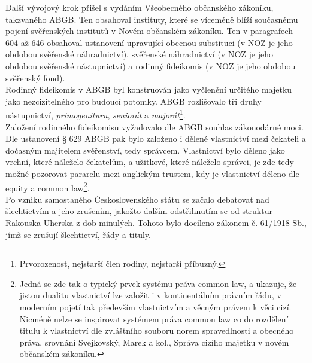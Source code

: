 \documentclass{article}
\begin{document}

Další vývojový krok přišel s vydáním Všeobecného občanského zákoníku, takzvaného ABGB. Ten obsahoval instituty, které se víceméně blíží současnému pojení svěřenských institutů v Novém občanském zákoníku. Ten v paragrafech 604 až 646 obsahoval ustanovení upravující obecnou substituci (v NOZ je jeho obdobou svěřenské náhradnictví), svěřenské náhradnictví (v NOZ je jeho obdobou svěřenské nástupnictví) a rodinný fideikomis (v NOZ je jeho obdobou svěřenský fond).\\

Rodinný fideikomis v ABGB byl konstruován jako vyčlenění určitého majetku jako nezcizitelného pro budoucí potomky. ABGB rozlišovalo tři druhy nástupnictví, \textit{primogenituru}, \textit{seniorát} a \textit{majorát}\footnote{Prvorozenost, nejstarší člen rodiny, nejstarší příbuzný.}.\\

Založení rodinného fideikomisu vyžadovalo dle ABGB souhlas zákonodárné moci. Dle ustanovení § 629 ABGB pak bylo založeno i dělené vlastnictví mezi čekateli a dočasným majitelem svěřenství, tedy správcem. Vlastnictví bylo děleno jako vrchní, které náleželo čekatelům, a užitkové, které náleželo správci, je zde tedy možné pozorovat pararelu mezi anglickým trustem, kdy je vlastnictví děleno dle equity a common law\footnote{Jedná se zde tak o typický prvek systému práva common law, a ukazuje, že jistou dualitu vlastnictví lze založit i v kontinentálním právním řádu, v moderním pojetí tak především vlastnictvím a věcným právem k věci cizí. Nicméně nelze se inspirovat systémem práva common law co do rozdělení titulu k vlastnictví dle zvláštního souboru norem spravedlnosti a obecného práva, srovnání Svejkovský, Marek a kol., Správa cizího majetku v novém občanském zákoníku.}.\\

Po vzniku samostaného Československého státu se začalo debatovat nad šlechtictvím a jeho zrušením, jakožto dalším odstřihnutím se od struktur Rakouska-Uherska z dob minulých. Tohoto bylo docíleno zákonem č. 61/1918 Sb., jímž se zrušují šlechtictví, řády a tituly.\\
\end{document}
